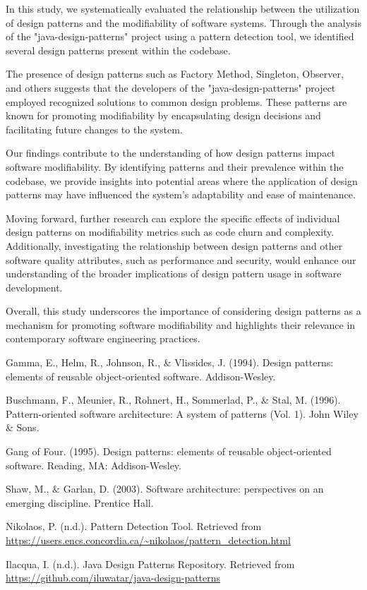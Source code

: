 \documentclass[conference]{IEEEtran}
\begin{document}
	In this study, we systematically evaluated the relationship between the utilization of design patterns and the modifiability of software systems. Through the analysis of the "java-design-patterns" project using a pattern detection tool, we identified several design patterns present within the codebase.
	
	The presence of design patterns such as Factory Method, Singleton, Observer, and others suggests that the developers of the "java-design-patterns" project employed recognized solutions to common design problems. These patterns are known for promoting modifiability by encapsulating design decisions and facilitating future changes to the system.
	
	Our findings contribute to the understanding of how design patterns impact software modifiability. By identifying patterns and their prevalence within the codebase, we provide insights into potential areas where the application of design patterns may have influenced the system's adaptability and ease of maintenance.
	
	Moving forward, further research can explore the specific effects of individual design patterns on modifiability metrics such as code churn and complexity. Additionally, investigating the relationship between design patterns and other software quality attributes, such as performance and security, would enhance our understanding of the broader implications of design pattern usage in software development.
	
	Overall, this study underscores the importance of considering design patterns as a mechanism for promoting software modifiability and highlights their relevance in contemporary software engineering practices.
	
	\begin{thebibliography}{99} %
		
		Gamma, E., Helm, R., Johnson, R., \& Vlissides, J. (1994). Design patterns: elements of reusable object-oriented software. Addison-Wesley.
		
		Buschmann, F., Meunier, R., Rohnert, H., Sommerlad, P., \& Stal, M. (1996). Pattern-oriented software architecture: A system of patterns (Vol. 1). John Wiley \& Sons.
		
		Gang of Four. (1995). Design patterns: elements of reusable object-oriented software. Reading, MA: Addison-Wesley.
		
		Shaw, M., \& Garlan, D. (2003). Software architecture: perspectives on an emerging discipline. Prentice Hall.
		
		Nikolaos, P. (n.d.). Pattern Detection Tool. Retrieved from \url{https://users.encs.concordia.ca/~nikolaos/pattern_detection.html}
		
		Ilacqua, I. (n.d.). Java Design Patterns Repository. Retrieved from \url{https://github.com/iluwatar/java-design-patterns}
		
	\end{thebibliography}
\end{document}
